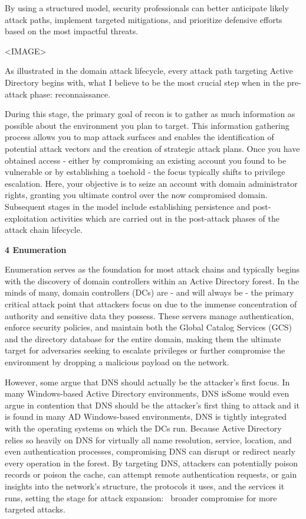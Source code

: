 By using a structured model, security professionals can better anticipate likely attack paths, implement targeted mitigations, and prioritize defensive efforts based on the most impactful threats.

<IMAGE>

As illustrated in the domain attack lifecycle, every attack path targeting Active Directory begins with, what I believe to be the most crucial step when in the pre-attack phase: reconnaissance.

During this stage, the primary goal of recon is to gather as much information as possible about the environment you plan to target. This information gathering process allows you to map attack surfaces and enables the identification of potential attack vectors and the creation of strategic attack plans. Once you have obtained access - either by compromising an existing account you found to be vulnerable or by establishing a toehold - the focus typically shifts to privilege escalation. Here, your objective is to seize an account with domain administrator rights, granting you ultimate control over the now compromised domain. Subsequent stages in the model include establishing persistence and post-exploitation activities which are carried out in the post-attack phases of the attack chain lifecycle.

\textbf{4 Enumeration}

Enumeration serves as the foundation for most attack chains and typically begins with the discovery of domain controllers within an Active Directory forest. In the minds of many, domain controllers (DCs) are - and will always be - the primary critical attack point that attackers focus on due to the immense concentration of authority and sensitive data they possess. These servers manage authentication, enforce security policies, and maintain both the Global Catalog Services (GCS) and the directory database for the entire domain, making them the ultimate target for adversaries seeking to escalate privileges or further compromise the environment by dropping a malicious payload on the network.

However, some argue that DNS should actually be the attacker’s first focus. In many Windows-based Active Directory environments, DNS isSome would even argue in contention that DNS should be the attacker’s first thing to attack and it is found in many AD Windows-based environments, DNS is tightly integrated with the operating systems on which the DCs run. Because Active Directory relies so heavily on DNS for virtually all name resolution, service, location, and even authentication processes, compromising DNS can disrupt or redirect nearly every operation in the forest. By targeting DNS, attackers can potentially poison records or poison the cache, can attempt remote authentication requests, or gain insights into the network’s structure, the protocols it uses, and the services it runs, setting the stage for attack expansion:  broader compromise for more targeted attacks.

